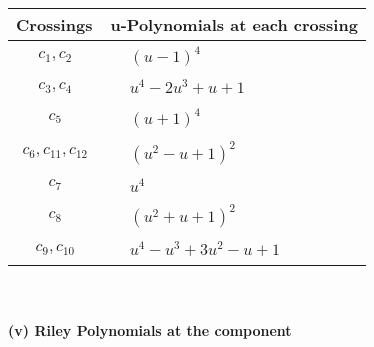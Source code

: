\documentclass[1p]{elsarticle_modified}
\theoremstyle{definition}
\begin{document}
\begin{tabular}{m{50pt}|m{274pt}}
Crossings & \hspace{64pt}u-Polynomials at each crossing \\
\hline $$\begin{aligned}c_{1},c_{2}\end{aligned}$$&$\begin{aligned}
&(u-1)^4
\end{aligned}$\\
\hline $$\begin{aligned}c_{3},c_{4}\end{aligned}$$&$\begin{aligned}
&u^4-2 u^3+u+1
\end{aligned}$\\
\hline $$\begin{aligned}c_{5}\end{aligned}$$&$\begin{aligned}
&(u+1)^4
\end{aligned}$\\
\hline $$\begin{aligned}c_{6},c_{11},c_{12}\end{aligned}$$&$\begin{aligned}
&(u^2- u+1)^2
\end{aligned}$\\
\hline $$\begin{aligned}c_{7}\end{aligned}$$&$\begin{aligned}
&u^4
\end{aligned}$\\
\hline $$\begin{aligned}c_{8}\end{aligned}$$&$\begin{aligned}
&(u^2+u+1)^2
\end{aligned}$\\
\hline $$\begin{aligned}c_{9},c_{10}\end{aligned}$$&$\begin{aligned}
&u^4- u^3+3 u^2- u+1
\end{aligned}$\\
\hline
\end{tabular}\\~\\
\newpage\renewcommand{\arraystretch}{1}
\flushleft \textbf{(v) Riley Polynomials at the component}\newline \\
\end{document}
